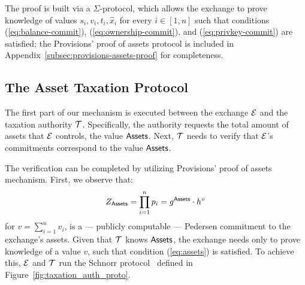 The proof is built via a $\Sigma$-protocol, which allows the exchange to prove
knowledge of values $s_i, v_i, t_i, \hat{x}_i$ for every $i \in [1, n]$ such
that conditions (\ref{eq:balance-commit}), (\ref{eq:ownership-commit}), and
(\ref{eq:privkey-commit}) are satisfied; the Provisions' proof of assets
protocol is included in Appendix~\ref{subsec:provisions-assets-proof} for
completeness.

\subsection{The Asset Taxation Protocol}\label{subsec:tax-authority-proto}

The first part of our mechanism is executed between the exchange $\mathcal{E}$
and the taxation authority $\mathcal{T}$. Specifically, the authority requests the
total amount of assets that $\mathcal{E}$ controls, \ie the value $\mathsf{Assets}$.
Next, $\mathcal{T}$ needs to verify that $\mathcal{E}$'s commitments correspond to
the value $\mathsf{Assets}$.

The verification can be completed by utilizing Provisions' proof of assets
mechanism. First, we observe that:
\begin{align}
    Z_{\mathsf{Assets}} = \prod_{i = 1}^n p_i = g^{\mathsf{Assets}} \cdot h^v \label{eq:assets}
\end{align}
for $v = {\sum_{i = 1}^n v_i}$, is a --- publicly computable --- Pedersen
commitment to the exchange's assets. Given that $\mathcal{T}$ knows $\mathsf{Assets}$, the
exchange needs only to prove knowledge of a value $v$, such that condition
(\ref{eq:assets}) is satisfied. To achieve this, $\mathcal{E}$ and $\mathcal{T}$ run
the Schnorr protocol~\cite{C:Schnorr89} defined in
Figure~\ref{fig:taxation_auth_proto}.

